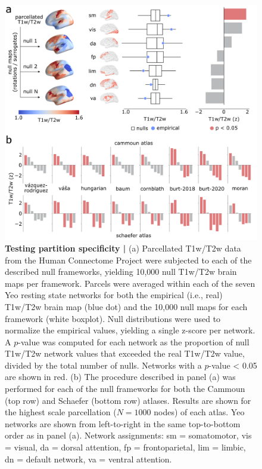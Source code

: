 \documentclass[12pt,aps,pra,reprint,showkeys]{revtex4-1}
\begin{document}
\begin{figure}[htp]
  \begin{center}
    \centerline{\includegraphics[width=\textwidth]{hcp-results.png}}
    \caption{
      \textbf{Testing partition specificity | }
      (a) Parcellated T1w/T2w data from the Human Connectome Project were subjected to each of the described null frameworks, yielding 10,000 null T1w/T2w brain maps per framework.
      Parcels were averaged within each of the seven Yeo resting state networks \citep{yeo2011organization} for both the empirical (i.e., real) T1w/T2w brain map (blue dot) and the 10,000 null maps for each framework (white boxplot).
      Null distributions were used to normalize the empirical values, yielding a single z-score per network.
      A $p$-value was computed for each network as the proportion of null T1w/T2w network values that exceeded the real T1w/T2w value, divided by the total number of nulls.
      Networks with a $p$-value < 0.05 are shown in red.
      (b) The procedure described in panel (a) was performed for each of the null frameworks for both the Cammoun (top row) and Schaefer (bottom row) atlases.
      Results are shown for the highest scale parcellation ($N = 1000$ nodes) of each atlas.
      Yeo networks are shown from left-to-right in the same top-to-bottom order as in panel (a).
      Network assignments: sm = somatomotor, vis = visual, da = dorsal attention, fp = frontoparietal, lim = limbic, dn = default network, va = ventral attention.
      }
    \label{figure-hcp-results}
  \end{center}
\end{figure}
\end{document}
